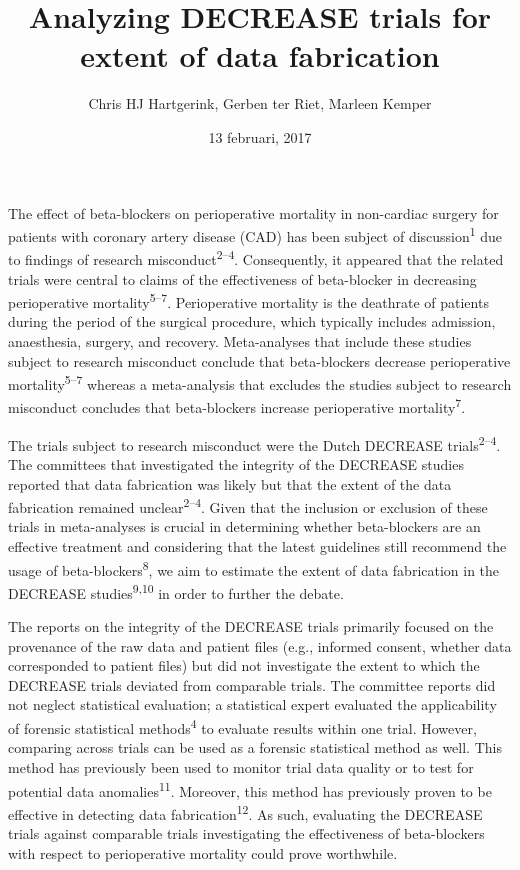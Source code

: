 \documentclass[]{article}
\title{Analyzing DECREASE trials for extent of data fabrication}
\author{Chris HJ Hartgerink, Gerben ter Riet, Marleen Kemper}
\date{13 februari, 2017}
\begin{document}
\maketitle

The effect of beta-blockers on perioperative mortality in non-cardiac
surgery for patients with coronary artery disease (CAD) has been subject
of discussion\textsuperscript{1} due to findings of research
misconduct\textsuperscript{2--4}. Consequently, it appeared that the
related trials were central to claims of the effectiveness of
beta-blocker in decreasing perioperative
mortality\textsuperscript{5--7}. Perioperative mortality is the
deathrate of patients during the period of the surgical procedure, which
typically includes admission, anaesthesia, surgery, and recovery.
Meta-analyses that include these studies subject to research misconduct
conclude that beta-blockers decrease perioperative
mortality\textsuperscript{5--7} whereas a meta-analysis that excludes
the studies subject to research misconduct concludes that beta-blockers
increase perioperative mortality\textsuperscript{7}.

The trials subject to research misconduct were the Dutch DECREASE
trials\textsuperscript{2--4}. The committees that investigated the
integrity of the DECREASE studies reported that data fabrication was
likely but that the extent of the data fabrication remained
unclear\textsuperscript{2--4}. Given that the inclusion or exclusion of
these trials in meta-analyses is crucial in determining whether
beta-blockers are an effective treatment and considering that the latest
guidelines still recommend the usage of
beta-blockers\textsuperscript{8}, we aim to estimate the extent of data
fabrication in the DECREASE studies\textsuperscript{9,10} in order to
further the debate.

The reports on the integrity of the DECREASE trials primarily focused on
the provenance of the raw data and patient files (e.g., informed
consent, whether data corresponded to patient files) but did not
investigate the extent to which the DECREASE trials deviated from
comparable trials. The committee reports did not neglect statistical
evaluation; a statistical expert evaluated the applicability of forensic
statistical methods\textsuperscript{4} to evaluate results within one
trial. However, comparing across trials can be used as a forensic
statistical method as well. This method has previously been used to
monitor trial data quality or to test for potential data
anomalies\textsuperscript{11}. Moreover, this method has previously
proven to be effective in detecting data
fabrication\textsuperscript{12}. As such, evaluating the DECREASE trials
against comparable trials investigating the effectiveness of
beta-blockers with respect to perioperative mortality could prove
worthwhile.
\end{document}
